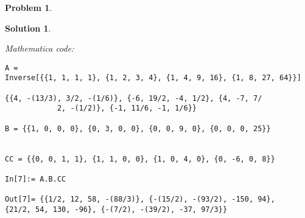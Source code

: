 \documentclass{book}
\theoremstyle{definition}
\newtheorem*{prob*}{Problem}
\newtheorem*{sln*}{Solution}
\begin{document}
\begin{prob*}
\begin{sln*}
\begin{enumerate}
\begin{enumerate}
				\textit{Mathematica code:}
				\begin{lstlisting}
A = 
Inverse[{{1, 1, 1, 1}, {1, 2, 3, 4}, {1, 4, 9, 16}, {1, 8, 27, 64}}]
				
{{4, -(13/3), 3/2, -(1/6)}, {-6, 19/2, -4, 1/2}, {4, -7, 7/
			2, -(1/2)}, {-1, 11/6, -1, 1/6}}
				
B = {{1, 0, 0, 0}, {0, 3, 0, 0}, {0, 0, 9, 0}, {0, 0, 0, 25}}
				
				
CC = {{0, 0, 1, 1}, {1, 1, 0, 0}, {1, 0, 4, 0}, {0, -6, 0, 8}}
						
In[7]:= A.B.CC
				
Out[7]= {{1/2, 12, 58, -(88/3)}, {-(15/2), -(93/2), -150, 94}, 
{21/2, 54, 130, -96}, {-(7/2), -(39/2), -37, 97/3}}
				\end{lstlisting}
			\end{enumerate}
		\end{enumerate}
		
	\end{sln*}






\end{prob*}

\newpage
\end{document}
